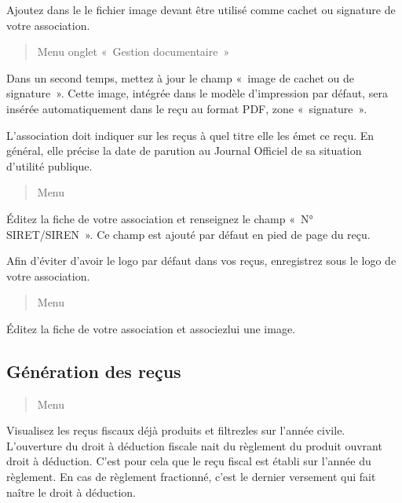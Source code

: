 \documentclass[a4paper,10pt,oneside,french]{sphinxmanual}
\begin{document}
Ajoutez dans le  le fichier image devant être utilisé comme cachet ou signature de votre association.
\begin{quote}

Menu  \sphinxhyphen{} onglet « Gestion documentaire »
\end{quote}

Dans un second temps, mettez à jour le champ « image de cachet ou de signature ».
Cette image, intégrée dans le modèle d’impression par défaut, sera insérée automatiquement dans le reçu au format PDF, zone « signature ».


L’association doit indiquer sur les reçus à quel titre elle les émet ce reçu.
En général, elle précise la date de parution au Journal Officiel de sa situation d’utilité publique.
\begin{quote}

Menu 
\end{quote}

Éditez la fiche de votre association et renseignez le champ « N° SIRET/SIREN ». Ce champ est ajouté par défaut en pied de page du reçu.


Afin d’éviter d’avoir le logo par défaut dans vos reçus, enregistrez sous  le logo de votre association.
\begin{quote}

Menu 
\end{quote}

Éditez la fiche de votre association et associez\sphinxhyphen{}lui une image.


\subsection{Génération des reçus}
\label{\detokenize{member/taxreceipt:generation-des-recus}}\begin{quote}

Menu 
\end{quote}

Visualisez les reçus fiscaux déjà produits et filtrez\sphinxhyphen{}les sur l’année civile.
L’ouverture du droit à déduction fiscale nait du règlement du produit ouvrant droit à déduction. C’est pour cela que le reçu fiscal est établi sur l’année du règlement. En cas de règlement fractionné, c’est le dernier versement qui fait naître le droit à déduction.
\begin{quote}

\noindent{}
\end{quote}
\end{document}

